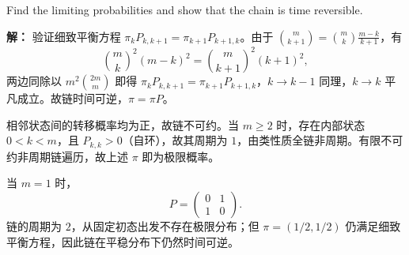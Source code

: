\documentclass[12pt,a4paper]{article}
\begin{document}
Find the limiting probabilities and show that the chain is time reversible.

\begin{answerbox}
\textbf{解：}
验证细致平衡方程 $\pi_k P_{k,k+1}=\pi_{k+1}P_{k+1,k}$。由于 $\binom{m}{k+1}=\binom{m}{k}\frac{m-k}{k+1}$，有
$$
\binom{m}{k}^2(m-k)^2=\binom{m}{k+1}^2(k+1)^2,
$$
两边同除以 $m^2\binom{2m}{m}$ 即得 $\pi_kP_{k,k+1}=\pi_{k+1}P_{k+1,k}$，$k\to k-1$ 同理，$k\to k$ 平凡成立。故链时间可逆，$\pi=\pi P$。

相邻状态间的转移概率均为正，故链不可约。当 $m\geq2$ 时，存在内部状态 $0<k<m$，且 $P_{k,k}>0$（自环），故其周期为 $1$，由类性质全链非周期。有限不可约非周期链遍历，故上述 $\pi$ 即为极限概率。

当 $m=1$ 时，
$$
P=\begin{pmatrix}0&1\\1&0\end{pmatrix}.
$$
链的周期为 $2$，从固定初态出发不存在极限分布；但 $\pi=(1/2,1/2)$ 仍满足细致平衡方程，因此链在平稳分布下仍然时间可逆。
\end{answerbox}
\end{document}
